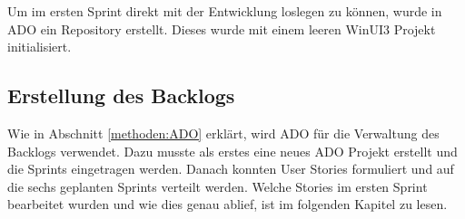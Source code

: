 Um im ersten Sprint direkt mit der Entwicklung loslegen zu können, wurde in \ac{ADO} ein Repository erstellt.
Dieses wurde mit einem leeren WinUI3 Projekt initialisiert.


\subsection{Erstellung des Backlogs}
Wie in Abschnitt \ref{methoden:ADO} erklärt, wird \ac{ADO} für die Verwaltung des Backlogs verwendet.
Dazu musste als erstes eine neues \ac{ADO} Projekt erstellt und die Sprints eingetragen werden.
Danach konnten User Stories formuliert und auf die sechs geplanten Sprints verteilt werden.
Welche Stories im ersten Sprint bearbeitet wurden und wie dies genau ablief, ist im folgenden Kapitel zu lesen.
